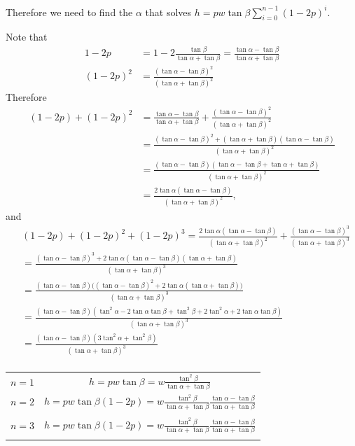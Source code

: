 \documentclass[12pt]{article}
\begin{document}
\newpage
Therefore we need to find the $\alpha$ that solves $h = pw\tan\beta\sum_{i=0}^{n-1}(1 - 2p)^i$.

Note that
\begin{align*}
  1 - 2p
  &= 1 - 2\frac{\tan\beta}{\tan\alpha + \tan\beta}
  = \frac{\tan\alpha - \tan\beta}{\tan\alpha + \tan\beta}\\
  (1 - 2p)^2
  &= \frac{(\tan\alpha - \tan\beta)^2}{(\tan\alpha + \tan\beta)^2}
\end{align*}
Therefore
\begin{align*}
  (1 - 2p) + (1 - 2p)^2
  &=
    \frac{\tan\alpha - \tan\beta}{\tan\alpha + \tan\beta} +
    \frac{(\tan\alpha - \tan\beta)^2}{(\tan\alpha + \tan\beta)^2}\\
  &=
    \frac
    {(\tan\alpha - \tan\beta)^2 + (\tan\alpha + \tan\beta)(\tan\alpha - \tan\beta)}
    {(\tan\alpha + \tan\beta)^2}\\
  &=
    \frac
    {(\tan\alpha - \tan\beta)(\tan\alpha - \tan\beta + \tan\alpha + \tan\beta)}
    {(\tan\alpha + \tan\beta)^2}\\
  &=
    \frac
    {2\tan\alpha(\tan\alpha - \tan\beta)}
    {(\tan\alpha + \tan\beta)^2},
\end{align*}
and
\begin{align*}
  &(1 - 2p) + (1 - 2p)^2 + (1 - 2p)^3
  =
    \frac
    {2\tan\alpha(\tan\alpha - \tan\beta)}
    {(\tan\alpha + \tan\beta)^2} +
    \frac{(\tan\alpha - \tan\beta)^3}{(\tan\alpha + \tan\beta)^3}\\
  &= \frac
    {(\tan\alpha - \tan\beta)^3 + 2\tan\alpha(\tan\alpha - \tan\beta)(\tan\alpha + \tan\beta)}
    {(\tan\alpha + \tan\beta)^3}\\
  &= \frac
    {(\tan\alpha - \tan\beta)\Big((\tan\alpha - \tan\beta)^2 + 2\tan\alpha(\tan\alpha + \tan\beta)\Big)}
    {(\tan\alpha + \tan\beta)^3}\\
  &= \frac
    {(\tan\alpha - \tan\beta)(\tan^2\alpha - 2\tan\alpha\tan\beta + \tan^2\beta + 2\tan^2\alpha + 2\tan\alpha\tan\beta)}
    {(\tan\alpha + \tan\beta)^3}\\
  &= \frac
    {(\tan\alpha - \tan\beta)(3\tan^2\alpha + \tan^2\beta)}
    {(\tan\alpha + \tan\beta)^3}\\
\end{align*}


\begin{tabular}{c|c}
  $n = 1$& $h = pw\tan\beta = w\frac{\tan^2\beta}{\tan\alpha + \tan\beta}$\\
  $n = 2$& $h = pw\tan\beta(1 - 2p) = w\frac{\tan^2\beta}{\tan\alpha + \tan\beta}\frac{\tan\alpha - \tan\beta}{\tan\alpha + \tan\beta}$\\ \\
  $n = 3$& $h = pw\tan\beta(1 - 2p) = w\frac{\tan^2\beta}{\tan\alpha + \tan\beta}\frac{\tan\alpha - \tan\beta}{\tan\alpha + \tan\beta}$\\ \\
\end{tabular}
\end{document}
